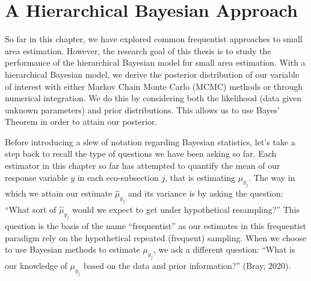 \documentclass[12pt,twoside]{reedthesis}
\begin{document}
\hypertarget{a-hierarchical-bayesian-approach}{%
\section{A Hierarchical Bayesian Approach}\label{a-hierarchical-bayesian-approach}}

So far in this chapter, we have explored common frequentist approaches to small area estimation. However, the research goal of this thesis is to study the performance of the hierarchical Bayesian model for small area estimation. With a hierarchical Bayesian model, we derive the posterior distribution of our variable of interest with either Markov Chain Monte Carlo (MCMC) methods or through numerical integration. We do this by considering both the likelihood (data given unknown parameters) and prior distributions. This allows us to use Bayes' Theorem in order to attain our posterior.

Before introducing a slew of notation regarding Bayesian statistics, let's take a step back to recall the type of questions we have been asking so far. Each estimator in this chapter so far has attempted to quantify the mean of our response variable \(y\) in each eco-subsection \(j\), that is estimating \(\mu_{y_j}\). The way in which we attain our estimate \(\hat\mu_{y_j}\) and its variance is by asking the question: ``What sort of \(\hat\mu_{y_j}\) would we expect to get under hypothetical resampling?'' This question is the basis of the name ``frequentist'' as our estimates in this frequentist paradigm rely on the hypothetical repeated (frequent) sampling. When we choose to use Bayesian methods to estimate \(\mu_{y_j}\), we ask a different question: ``What is our knowledge of \(\mu_{y_j}\) based on the data and prior information?'' (Bray, 2020).
\end{document}
